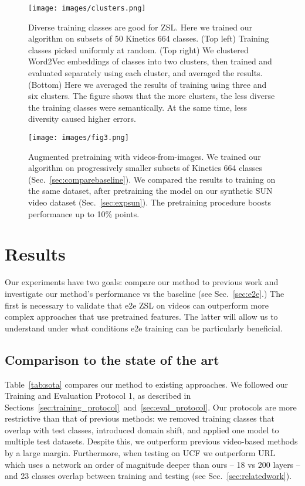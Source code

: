 \documentclass[10pt,twocolumn,letterpaper]{article}
\begin{document}
\begin{figure}
\centering
\texttt{[image: images/clusters.png]}
\caption{Diverse training classes are good for ZSL. Here we trained our algorithm on subsets of 50 Kinetics 664 classes. (Top left) Training classes picked uniformly at random. (Top right) We clustered Word2Vec embeddings of classes into two clusters, then trained and evaluated separately using each cluster, and averaged the results. (Bottom) Here we averaged the results of training using three and six clusters. The figure shows that the more clusters, the less diverse the training classes were semantically. At the same time, less diversity caused higher errors.}
\label{fig:cluster}
\end{figure}


\begin{figure}
\centering
\texttt{[image: images/fig3.png]}
\caption{Augmented pretraining with videos-from-images. We trained our algorithm on progressively smaller subsets of Kinetics 664 classes (Sec.~\ref{sec:comparebaseline}). We compared the results to training on the same dataset, after pretraining the model on our synthetic SUN video dataset (Sec.~\ref{sec:expsun}). The pretraining procedure boosts performance up to 10\% points.}
\label{fig:sun}
\end{figure}


\section{Results}\label{sec:experiment}
Our experiments have two goals: compare our method to previous work and investigate our method's performance vs the baseline (see Sec.~\ref{sec:e2e}.) The first is necessary to validate that e2e ZSL on videos can outperform more complex approaches that use pretrained features. The latter will allow us to understand under what conditions e2e training can be particularly beneficial. 

\subsection{Comparison to the state of the art}
Table~\ref{tab:sota} compares our method to existing approaches. We followed our Training and Evaluation Protocol 1, as described in Sections~\ref{sec:training_protocol}~and~\ref{sec:eval_protocol}. Our protocols are more restrictive than that of previous methods: we removed training classes that overlap with test classes, introduced domain shift, and applied one model to multiple test datasets. Despite this, we outperform previous video-based methods by a large margin. Furthermore, when testing on UCF we outperform URL~\cite{uar} which uses a network an order of magnitude deeper than ours -- 18 vs 200 layers -- and 23 classes overlap between training and testing (see Sec.~\ref{sec:relatedwork}).
\end{document}
